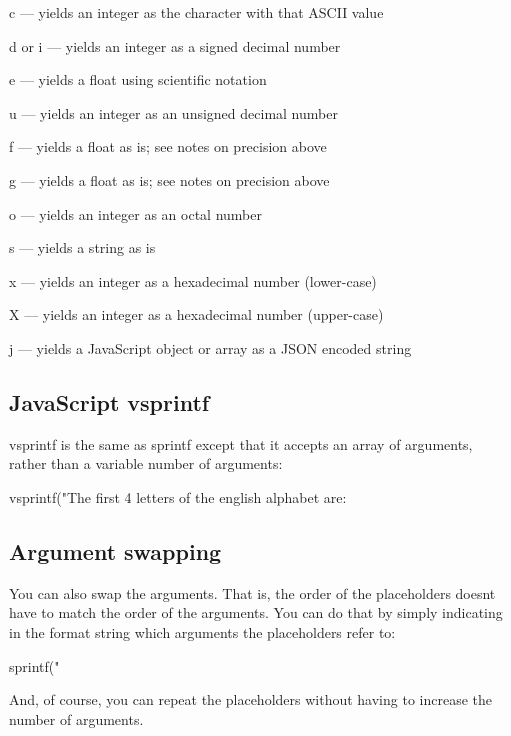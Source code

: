 \begin{DoxyItemize}
\begin{DoxyItemize}
\item {\ttfamily c} — yields an integer as the character with that A\+S\+C\+II value
\item {\ttfamily d} or {\ttfamily i} — yields an integer as a signed decimal number
\item {\ttfamily e} — yields a float using scientific notation
\item {\ttfamily u} — yields an integer as an unsigned decimal number
\item {\ttfamily f} — yields a float as is; see notes on precision above
\item {\ttfamily g} — yields a float as is; see notes on precision above
\item {\ttfamily o} — yields an integer as an octal number
\item {\ttfamily s} — yields a string as is
\item {\ttfamily x} — yields an integer as a hexadecimal number (lower-\/case)
\item {\ttfamily X} — yields an integer as a hexadecimal number (upper-\/case)
\item {\ttfamily j} — yields a Java\+Script object or array as a J\+S\+ON encoded string
\end{DoxyItemize}
\end{DoxyItemize}

\subsection*{Java\+Script {\ttfamily vsprintf}}

{\ttfamily vsprintf} is the same as {\ttfamily sprintf} except that it accepts an array of arguments, rather than a variable number of arguments\+: \begin{DoxyVerb}vsprintf("The first 4 letters of the english alphabet are: %
\end{DoxyVerb}


\subsection*{Argument swapping}

You can also swap the arguments. That is, the order of the placeholders doesn\textquotesingle{}t have to match the order of the arguments. You can do that by simply indicating in the format string which arguments the placeholders refer to\+: \begin{DoxyVerb}sprintf("%
\end{DoxyVerb}
 And, of course, you can repeat the placeholders without having to increase the number of arguments.

